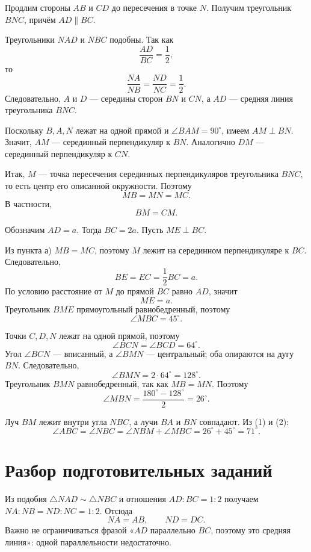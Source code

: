 \begin{answerbox}[Пункт а)]
Продлим стороны \(AB\) и \(CD\) до пересечения в точке \(N\). Получим
треугольник \(BNC\), причём \(AD\parallel BC\).

Треугольники \(NAD\) и \(NBC\) подобны. Так как
\[
\frac{AD}{BC}=\frac12,
\]
то
\[
\frac{NA}{NB}=\frac{ND}{NC}=\frac12.
\]
Следовательно, \(A\) и \(D\) — середины сторон \(BN\) и \(CN\), а \(AD\)
— средняя линия треугольника \(BNC\).

Поскольку \(B,A,N\) лежат на одной прямой и \(\angle BAM=90^\circ\),
имеем \(AM\perp BN\). Значит, \(AM\) — серединный перпендикуляр к \(BN\).
Аналогично \(DM\) — серединный перпендикуляр к \(CN\).

Итак, \(M\) — точка пересечения серединных перпендикуляров треугольника
\(BNC\), то есть центр его описанной окружности. Поэтому
\[
MB=MN=MC.
\]
В частности,
\[
\boxed{BM=CM}.
\]
\end{answerbox}

\circumcenterfigure

\begin{answerbox}[Пункт б)]
Обозначим \(AD=a\). Тогда \(BC=2a\). Пусть \(ME\perp BC\).

Из пункта а) \(MB=MC\), поэтому \(M\) лежит на серединном перпендикуляре
к \(BC\). Следовательно,
\[
BE=EC=\frac12BC=a.
\]
По условию расстояние от \(M\) до прямой \(BC\) равно \(AD\), значит
\[
ME=a.
\]
Треугольник \(BME\) прямоугольный равнобедренный, поэтому
\[
\angle MBC=45^\circ. \tag{1}
\]

Точки \(C,D,N\) лежат на одной прямой, поэтому
\[
\angle BCN=\angle BCD=64^\circ.
\]
Угол \(\angle BCN\) — вписанный, а \(\angle BMN\) — центральный; оба
опираются на дугу \(BN\). Следовательно,
\[
\angle BMN=2\cdot64^\circ=128^\circ.
\]
Треугольник \(BMN\) равнобедренный, так как \(MB=MN\). Поэтому
\[
\angle MBN=\frac{180^\circ-128^\circ}{2}=26^\circ. \tag{2}
\]

Луч \(BM\) лежит внутри угла \(NBC\), а лучи \(BA\) и \(BN\) совпадают.
Из (1) и (2):
\[
\angle ABC=\angle NBC
=\angle NBM+\angle MBC
=26^\circ+45^\circ
=\boxed{71^\circ}.
\]
\end{answerbox}

\section{Разбор подготовительных заданий}

\begin{teacherbox}
Из подобия \(\triangle NAD\sim\triangle NBC\) и отношения \(AD:BC=1:2\)
получаем \(NA:NB=ND:NC=1:2\). Отсюда
\[
NA=AB,
\qquad
ND=DC.
\]
Важно не ограничиваться фразой «\(AD\) параллельно \(BC\), поэтому это
средняя линия»: одной параллельности недостаточно.
\end{teacherbox}

